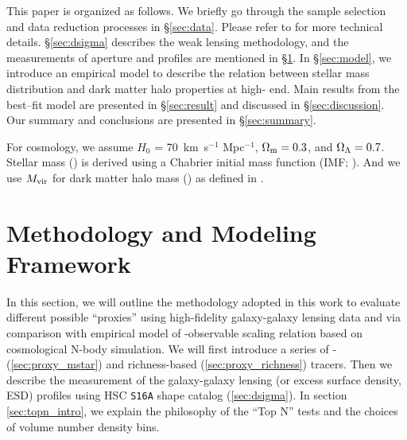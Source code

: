 \documentclass[a4paper,fleqn,usenatbib]{mnras}
\begin{document}

    This paper is organized as follows.
    We briefly go through the sample selection and data reduction processes in
    \S \ref{sec:data}.
    Please refer to  for more technical details.
    \S \ref{sec:dsigma} describes the weak lensing methodology, and the
    measurements of aperture \mstar{} and \mden{} profiles are mentioned in
    \S \ref{sec:method}.
    In \S \ref{sec:model}, we introduce an empirical model to describe the relation
    between stellar mass distribution and dark matter halo properties at
    high-\mstar{} end.
    Main results from the best--fit model are presented in \S \ref{sec:result} and
    discussed in \S \ref{sec:discussion}.
    Our summary and conclusions are presented in \S \ref{sec:summary}.


    For cosmology, we assume $H_0$ = 70~km~s$^{-1}$ Mpc$^{-1}$,
    ${\Omega}_{\rm m}=0.3$, and ${\Omega}_{\rm \Lambda}=0.7$.
    Stellar mass (\mstar{}) is derived using a Chabrier initial mass function
    (IMF; \citealt{Chabrier2003}).
    And we use $M_{\rm vir}$ for dark matter halo mass (\mhalo{}) as
    defined in \citealt{BryanNorman1998}.


\section{Methodology and Modeling Framework}
    \label{sec:method}


    In this section, we will outline the methodology adopted in this work to evaluate different
    possible \mvir{} ``proxies'' using high-fidelity galaxy-galaxy lensing data and via
    comparison with empirical model of \mvir{}-observable scaling relation based on cosmological
    N-body simulation.
    We will first introduce a series of \mstar{}- (\ref{sec:proxy_mstar}) and richness-based
    (\ref{sec:proxy_richness}) \mvir{} tracers.
    Then we describe the measurement of the galaxy-galaxy lensing \dsigma{} (or excess surface
    density, ESD) profiles using HSC \texttt{S16A} shape catalog (\ref{sec:dsigma}).
    In section \ref{sec:topn_intro}, we explain the philosophy of the ``Top N'' tests and the
    choices of volume number density bins. 
\end{document}
